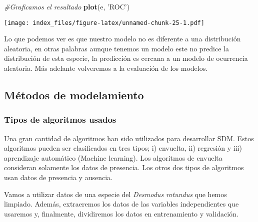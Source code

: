 \documentclass[]{article}
\newenvironment{Shaded}{\begin{snugshade}}{\end{snugshade}}
\newcommand{\KeywordTok}[1]{\textcolor[rgb]{0.13,0.29,0.53}{\textbf{{#1}}}}
\newcommand{\StringTok}[1]{\textcolor[rgb]{0.31,0.60,0.02}{{#1}}}
\newcommand{\CommentTok}[1]{\textcolor[rgb]{0.56,0.35,0.01}{\textit{{#1}}}}
\newcommand{\NormalTok}[1]{{#1}}
\begin{document}
\begin{Shaded}
\begin{Highlighting}[]
\CommentTok{#Graficamos el resultado}
\KeywordTok{plot}\NormalTok{(e, }\StringTok{'ROC'}\NormalTok{)}
\end{Highlighting}
\end{Shaded}

\texttt{[image: index\_files/figure-latex/unnamed-chunk-25-1.pdf]}

Lo que podemos ver es que nuestro modelo no es diferente a una
distribución aleatoria, en otras palabras aunque tenemos un modelo este
no predice la distribución de esta especie, la predicción es cercana a
un modelo de ocurrencia aleatoria. Más adelante volveremos a la
evaluación de los modelos.

\subsection{Métodos de modelamiento}\label{metodos-de-modelamiento}

\subsubsection{Tipos de algoritmos
usados}\label{tipos-de-algoritmos-usados}

Una gran cantidad de algoritmos han sido utilizados para desarrollar
SDM. Estos algoritmos pueden ser clasificados en tres tipos; i)
envuelta, ii) regresión y iii) aprendizaje automático (Machine
learning). Los algoritmos de envuelta consideran solamente los datos de
presencia. Los otros dos tipos de algoritmos usan datos de presencia y
ausencia.

Vamos a utilizar datos de una especie del \emph{Desmodus rotundus} que
hemos limpiado. Además, extraeremos los datos de las variables
independientes que usaremos y, finalmente, dividiremos los datos en
entrenamiento y validación.
\end{document}
